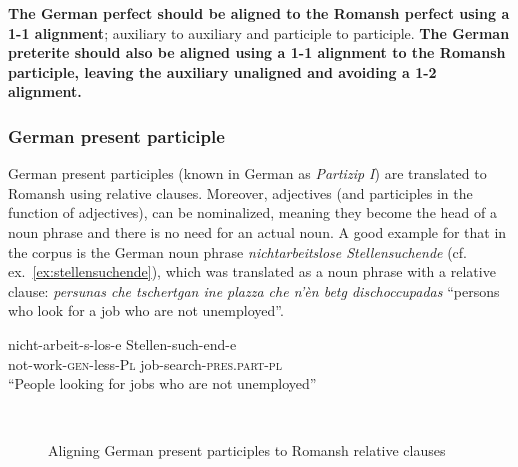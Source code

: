 \textbf{The German perfect should be aligned to the Romansh perfect using a 1-1 alignment}; auxiliary to auxiliary and participle to participle. 
\textbf{The German preterite should also be aligned using a 1-1 alignment to the Romansh participle, leaving the auxiliary unaligned and avoiding a 1-2 alignment.}

\subsubsection{German present participle}
German present participles (known in German as \emph{Partizip I}) are translated to Romansh using relative clauses. Moreover, adjectives (and participles in the function of adjectives), can be nominalized, meaning they become the head of a noun phrase and there is no need for an actual noun. 
A good example for that in the corpus is the German noun phrase \emph{nichtarbeitslose Stellensuchende} (cf. ex.~\ref{ex:stellensuchende}), which was translated as a noun phrase with a relative clause: \emph{persunas che tschertgan ine plazza che n'èn betg dischoccupadas} \enquote{persons who look for a job who are not unemployed}.

\begin{exe}
   \ex\label{ex:stellensuchende} 
   \gll nicht-arbeit-s-los-e Stellen-such-end-e  \\
        not-work-\textsc{gen}-less-\textsc{Pl} job-search-\textsc{pres.part}-\textsc{pl} \\
        \trans \enquote{People looking for jobs who are not unemployed}
\end{exe}

\begin{figure}
\centering
{}  \

\vspace*{1cm}

          
\caption{Aligning German present participles to Romansh relative clauses}
\end{figure}

